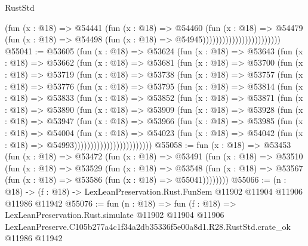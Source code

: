 \begin{lexlean}{RustStd}
\begin{coremodule}
                                          (fun (x : @18) =>
                                          @54441
                                            (fun (x : @18) =>
                                            @54460
                                              (fun (x : @18) =>
                                              @54479
                                                (fun (x : @18) =>
                                                @54498
                                                  (fun (x : @18) => @54945))))))))))))))))))))))))
@55041 := @53605
    (fun (x : @18) =>
    @53624
      (fun (x : @18) =>
      @53643
        (fun (x : @18) =>
        @53662
          (fun (x : @18) =>
          @53681
            (fun (x : @18) =>
            @53700
              (fun (x : @18) =>
              @53719
                (fun (x : @18) =>
                @53738
                  (fun (x : @18) =>
                  @53757
                    (fun (x : @18) =>
                    @53776
                      (fun (x : @18) =>
                      @53795
                        (fun (x : @18) =>
                        @53814
                          (fun (x : @18) =>
                          @53833
                            (fun (x : @18) =>
                            @53852
                              (fun (x : @18) =>
                              @53871
                                (fun (x : @18) =>
                                @53890
                                  (fun (x : @18) =>
                                  @53909
                                    (fun (x : @18) =>
                                    @53928
                                      (fun (x : @18) =>
                                      @53947
                                        (fun (x : @18) =>
                                        @53966
                                          (fun (x : @18) =>
                                          @53985
                                            (fun (x : @18) =>
                                            @54004
                                              (fun (x : @18) =>
                                              @54023
                                                (fun (x : @18) =>
                                                @54042
                                                  (fun (x : @18) => @54993))))))))))))))))))))))))
@55058 := fun (x : @18) =>
  @53453
    (fun (x : @18) =>
    @53472
      (fun (x : @18) =>
      @53491
        (fun (x : @18) =>
        @53510
          (fun (x : @18) =>
          @53529
            (fun (x : @18) =>
            @53548
              (fun (x : @18) => @53567 (fun (x : @18) => @53586 (fun (x : @18) => @55041))))))))
@55066 := (n : @18) ->
  (f : @18) -> LexLeanPreservation.Rust.FunSem @11902 @11904 @11906 @11986 @11942
@55076 := fun (n : @18) =>
  fun (f : @18) =>
  LexLeanPreservation.Rust.simulate
    @11902
    @11904
    @11906
    LexLeanPreserve.C105b277a4c1f34a2db35336f5e00a8d1.R28.RustStd.crate_ok
    @11986
    @11942
\end{coremodule}
\end{lexlean}

